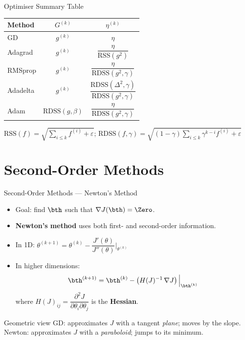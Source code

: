 \begin{frame}{Optimiser Summary Table}
  \begin{center}
  \renewcommand{\arraystretch}{1.6}
  \begin{tabular}{l|cc}
    \toprule
    \textbf{Method} & $G^{(k)}$ & $\eta^{(k)}$\\
    \midrule
    GD       & $g^{(k)}$ & $\eta$\\
    Adagrad  & $g^{(k)}$ & $\dfrac{\eta}{\mathrm{RSS}(g^2)}$\\
    RMSprop  & $g^{(k)}$ & $\dfrac{\eta}{\mathrm{RDSS}(g^2,\gamma)}$\\
    Adadelta & $g^{(k)}$ & $\dfrac{\mathrm{RDSS}(\Delta^2,\gamma)}{\mathrm{RDSS}(g^2,\gamma)}$\\
    Adam     & $\mathrm{RDSS}(g,\beta)$ & $\dfrac{\eta}{\mathrm{RDSS}(g^2,\gamma)}$\\
    \bottomrule
  \end{tabular}
  \end{center}
  \vspace{4pt}
  \small
  $\mathrm{RSS}(f)=\sqrt{\sum_{i\le k} f^{(i)}+\varepsilon}$;\quad
  $\mathrm{RDSS}(f,\gamma)=\sqrt{(1-\gamma)\sum_{i\le k}\gamma^{k-i}f^{(i)}+\varepsilon}$
\end{frame}

\section{Second-Order Methods}

\begin{frame}{Second-Order Methods — Newton's Method}
  \begin{itemize}
    \item Goal: find $\bth$ such that $\nabla J(\bth)=\Zero$.
    \item \textbf{Newton's method} uses both first- and second-order information.
    \item In 1D: $\theta^{(k+1)} = \theta^{(k)} - \dfrac{J'(\theta)}{J''(\theta)}\Big|_{\theta^{(k)}}$
    \item In higher dimensions:
      \[
        \bth^{(k+1)} = \bth^{(k)} - \left(H(J)^{-1}\,\nabla J\right)\Big|_{\bth^{(k)}}
      \]
      where $H(J)_{ij}=\dfrac{\partial^2 J}{\partial\theta_i\partial\theta_j}$ is the \textbf{Hessian}.
  \end{itemize}
  \begin{exampleblock}{Geometric view}
    GD: approximates $J$ with a tangent \emph{plane}; moves by the slope.\\
    Newton: approximates $J$ with a \emph{paraboloid}; jumps to its minimum.
  \end{exampleblock}
\end{frame}

